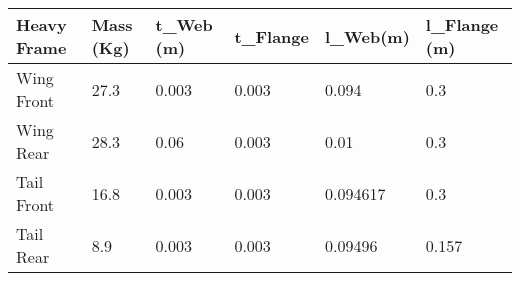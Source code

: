 \begin{tabular}{llllll}
Heavy Frame & Mass (Kg) & t_{Web} (m) & t_{Flange} & l_{Web}(m) & l_{Flange} (m) \\ 
\hline 
Wing Front & 27.3 & 0.003 & 0.003 & 0.094 & 0.3 \\ 
Wing Rear & 28.3 & 0.06 & 0.003 & 0.01 & 0.3 \\ 
Tail Front & 16.8 & 0.003 & 0.003 & 0.094617 & 0.3 \\ 
Tail Rear & 8.9 & 0.003 & 0.003 & 0.09496 & 0.157 \\ 
\hline 
\end{tabular}